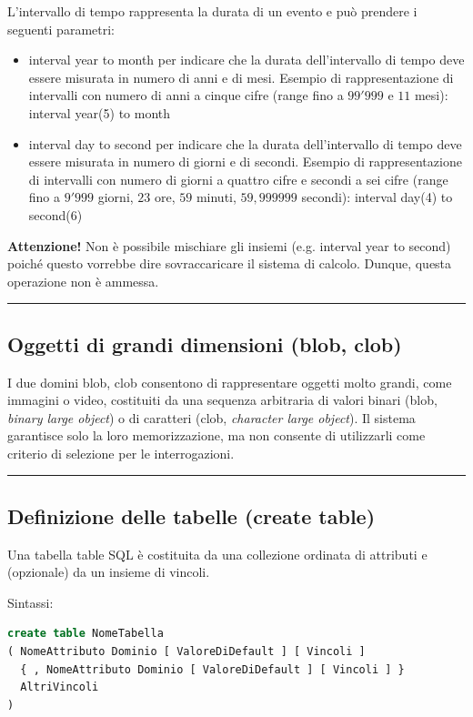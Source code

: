 \documentclass[a4paper]{article}
\newcommand{\longline}{\noindent\rule{\textwidth}{0.4pt}}
\begin{document}
	\noindent
	L'intervallo di tempo rappresenta la durata di un evento e può prendere i seguenti parametri:
	\begin{itemize}
		\item \textsf{interval year to month} per indicare che la durata dell'intervallo di tempo deve essere misurata in numero di anni e di mesi. Esempio di rappresentazione di intervalli con numero di anni a cinque cifre (range fino a $99'999$ e $11$ mesi): \textsf{interval year(5) to month}
		\item \textsf{interval day to second} per indicare che la durata dell'intervallo di tempo deve essere misurata in numero di giorni e di secondi. Esempio di rappresentazione di intervalli con numero di giorni a quattro cifre e secondi a sei cifre (range fino a $9'999$ giorni, $23$ ore, $59$ minuti, $59,999999$ secondi): \textsf{interval day(4) to second(6)}
	\end{itemize}
	\textbf{Attenzione!} Non è possibile mischiare gli insiemi (e.g. \textsf{interval year to second}) poiché questo vorrebbe dire sovraccaricare il sistema di calcolo. Dunque, questa operazione non è ammessa.
	
	\longline
	
	\subsection{Oggetti di grandi dimensioni (\textsf{blob, clob})}
	
	I due domini \textcolor{Red3}{\textsf{blob, clob}} consentono di rappresentare oggetti molto grandi, come immagini o video, costituiti da una sequenza arbitraria di valori binari (\textsf{blob}, \emph{binary large object}) o di caratteri (\textsf{clob}, \emph{character large object}). Il sistema garantisce solo la loro memorizzazione, ma non consente di utilizzarli come criterio di selezione per le interrogazioni.
	
	\longline
	
	\subsection{Definizione delle tabelle (\textsf{create table})}
	
	Una tabella \textcolor{Red3}{\textsf{table}} SQL è costituita da una collezione ordinata di attributi e (opzionale) da un insieme di vincoli.\newline
	
	\noindent
	Sintassi:
	\begin{lstlisting}[language=SQL]
create table NomeTabella
( NomeAttributo Dominio [ ValoreDiDefault ] [ Vincoli ]
  { , NomeAttributo Dominio [ ValoreDiDefault ] [ Vincoli ] }
  AltriVincoli
) \end{lstlisting}
	
\end{document}

